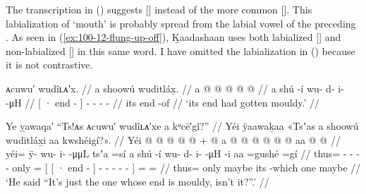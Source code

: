The transcription  in (\lastx) suggests  [] instead of the more common  [].
This labialization of  ‘mouth’ is probably spread from the labial vowel of the preceding .
As seen in (\ref{ex:100-12-flung-up-off}), Ḵaadashaan uses both labialized [] and non-labialized [] in this same word.
I have omitted the labialization in (\lastx) because it is not contrastive.

\ex\label{ex:100-10-end-mouldy}%
%
\begingl
	\glpreamble	ᴀcuwu′ wudîʟᴀ′x. //
	\glpreamble	a shoowú wuditláx̱. //
	\gla	{} a  @ {} {}  @ {} @ {} @ {} @ {} //
	\glb	{} a shú -í {} wu- d- i-  -μH //
	\glc	{}[ · end - {}] - - -  - //
	\gld	{} its end -of {}  {} {} {} {} //
	\glft	‘its end had gotten mouldy.’
		//
\endgl
\xe

\ex\label{ex:100-11-he-complains}%
%
\begingl
	\glpreamble	Ye ỵawaqa′ “Ts!ᴀs ᴀcuwu′ wudîʟᴀ′xe a kᵘcē′gî?” //
	\glpreamble	Yéi ÿaawaḵaa «\!Tsʼas a shoowú wuditláx̱i aa kwshéigí?\!». //
	\gla	Yéi @  @ {} @ {} @ {} @ {} +
			 @ {}
			{} {} a  @ {} {}
				 @ {} @ {} @ {} @ {} @ {} {} aa @
			 @ {} //
	\glb	yéi= ÿ- wu- i-  -μμL
			tsʼa =sí
			{} {} a shú -í {}
				wu- d- i-  -μH -i {} aa
			=gushé =gí //
	\glc	thus= - - -  -
			only =
			{}[ {}[ ·\xx{pss} end - {}]
				- - -  - - {}] 
			= = //
	\gld	thus=  {} {} {} {}
			only \•maybe
			{} {} its  {} {}
				 {} {} {} {} -which {} one
			\•maybe \• //
	\glft	‘He said “It’s just the one whose end is mouldy, isn’t it?”.’
		//
\endgl
\xe

